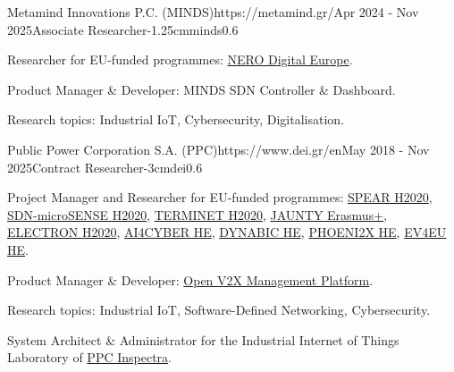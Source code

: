 \documentclass{mycv}
\begin{document}
	\vspace*{0.5cm}

	\begin{EntryDatedLogo}{Metamind Innovations P.C. (MINDS)}{https://metamind.gr/}{Apr 2024 - Nov 2025}{Associate Researcher}{-1.25cm}{minds}{0.6}
		\begin{Itemize}
			\item Researcher for EU-funded programmes: \href{https://metamind.gr/project/nero/}{NERO Digital Europe}.
			\item Product Manager \& Developer: MINDS SDN Controller \& Dashboard.
			\item Research topics: Industrial IoT, Cybersecurity, Digitalisation.
		\end{Itemize}
	\end{EntryDatedLogo}

	\vspace*{0.5cm}
	
	\begin{EntryDatedLogo}{Public Power Corporation S.A. (PPC)}{https://www.dei.gr/en}{May 2018 - Nov 2025}{Contract Researcher}{-3cm}{dei}{0.6}
		\begin{Itemize}
			\item Project Manager and Researcher for EU-funded programmes: \href{https://cordis.europa.eu/project/id/787011}{SPEAR H2020}, \href{https://cordis.europa.eu/project/id/833955}{SDN-microSENSE H2020}, \href{https://cordis.europa.eu/project/id/957406}{TERMINET H2020}, \href{https://www.jaunty.eu/}{JAUNTY Erasmus+}, \href{https://cordis.europa.eu/project/id/101021936}{ELECTRON H2020}, \href{https://cordis.europa.eu/project/id/101070450}{AI4CYBER HE}, \href{https://cordis.europa.eu/project/id/101070455}{DYNABIC HE}, \href{https://cordis.europa.eu/project/id/101070586}{PHOENI2X HE}, \href{https://cordis.europa.eu/project/id/101056765}{EV4EU HE}.
			\item Product Manager \& Developer: \href{https://github.com/EV4EU/ov2xmp}{Open V2X Management Platform}. 
			\item Research topics: Industrial IoT, Software-Defined Networking, Cybersecurity.
			\item System Architect \& Administrator for the Industrial Internet of Things Laboratory of \href{https://www.ppcgroup.com/en/ppc-inspectra/}{PPC Inspectra}.
		\end{Itemize}
	\end{EntryDatedLogo}
	
\end{document}
